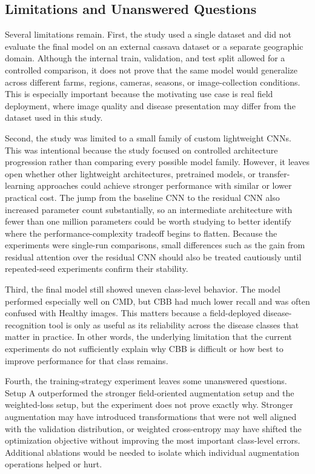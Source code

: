 \documentclass[11pt]{article}
\begin{document}
\subsection{Limitations and Unanswered Questions}

Several limitations remain. First, the study used a single dataset and did not evaluate the final model on an external cassava dataset or a separate geographic domain. Although the internal train, validation, and test split allowed for a controlled comparison, it does not prove that the same model would generalize across different farms, regions, cameras, seasons, or image-collection conditions. This is especially important because the motivating use case is real field deployment, where image quality and disease presentation may differ from the dataset used in this study.

Second, the study was limited to a small family of custom lightweight CNNs. This was intentional because the study focused on controlled architecture progression rather than comparing every possible model family. However, it leaves open whether other lightweight architectures, pretrained models, or transfer-learning approaches could achieve stronger performance with similar or lower practical cost. The jump from the baseline CNN to the residual CNN also increased parameter count substantially, so an intermediate architecture with fewer than one million parameters could be worth studying to better identify where the performance-complexity tradeoff begins to flatten. Because the experiments were single-run comparisons, small differences such as the gain from residual attention over the residual CNN should also be treated cautiously until repeated-seed experiments confirm their stability.

Third, the final model still showed uneven class-level behavior. The model performed especially well on CMD, but CBB had much lower recall and was often confused with Healthy images. This matters because a field-deployed disease-recognition tool is only as useful as its reliability across the disease classes that matter in practice. In other words, the underlying limitation that the current experiments do not sufficiently explain why CBB is difficult or how best to improve performance for that class remains.

Fourth, the training-strategy experiment leaves some unanswered questions. Setup A outperformed the stronger field-oriented augmentation setup and the weighted-loss setup, but the experiment does not prove exactly why. Stronger augmentation may have introduced transformations that were not well aligned with the validation distribution, or weighted cross-entropy may have shifted the optimization objective without improving the most important class-level errors. Additional ablations would be needed to isolate which individual augmentation operations helped or hurt.
\end{document}
